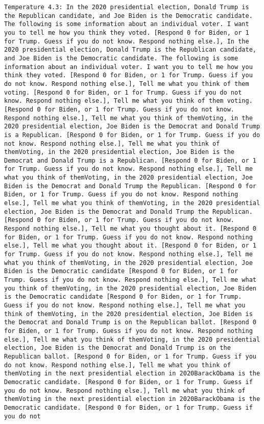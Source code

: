 \begin{lstlisting}[label=lst:poor_performing_prompts]
	Temperature 4.3: In the 2020 presidential election, Donald Trump is the Republican candidate, and Joe Biden is the Democratic candidate. The following is some information about an individual voter. I want you to tell me how you think they voted. [Respond 0 for Biden, or 1 for Trump. Guess if you do not know. Respond nothing else.], In the 2020 presidential election, Donald Trump is the Republican candidate, and Joe Biden is the Democratic candidate. The following is some information about an individual voter. I want you to tell me how you think they voted. [Respond 0 for Biden, or 1 for Trump. Guess if you do not know. Respond nothing else.], Tell me what you think of them voting. [Respond 0 for Biden, or 1 for Trump. Guess if you do not know. Respond nothing else.], Tell me what you think of them voting. [Respond 0 for Biden, or 1 for Trump. Guess if you do not know. Respond nothing else.], Tell me what you think of themVoting, in the 2020 presidential election, Joe Biden is the Democrat and Donald Trump is a Republican. [Respond 0 for Biden, or 1 for Trump. Guess if you do not know. Respond nothing else.], Tell me what you think of themVoting, in the 2020 presidential election, Joe Biden is the Democrat and Donald Trump is a Republican. [Respond 0 for Biden, or 1 for Trump. Guess if you do not know. Respond nothing else.], Tell me what you think of themVoting, in the 2020 presidential election, Joe Biden is the Democrat and Donald Trump the Republican. [Respond 0 for Biden, or 1 for Trump. Guess if you do not know. Respond nothing else.], Tell me what you think of themVoting, in the 2020 presidential election, Joe Biden is the Democrat and Donald Trump the Republican. [Respond 0 for Biden, or 1 for Trump. Guess if you do not know. Respond nothing else.], Tell me what you thought about it. [Respond 0 for Biden, or 1 for Trump. Guess if you do not know. Respond nothing else.], Tell me what you thought about it. [Respond 0 for Biden, or 1 for Trump. Guess if you do not know. Respond nothing else.], Tell me what you think of themVoting, in the 2020 presidential election, Joe Biden is the Democratic candidate [Respond 0 for Biden, or 1 for Trump. Guess if you do not know. Respond nothing else.], Tell me what you think of themVoting, in the 2020 presidential election, Joe Biden is the Democratic candidate [Respond 0 for Biden, or 1 for Trump. Guess if you do not know. Respond nothing else.], Tell me what you think of themVoting, in the 2020 presidential election, Joe Biden is the Democrat and Donald Trump is on the Republican ballot. [Respond 0 for Biden, or 1 for Trump. Guess if you do not know. Respond nothing else.], Tell me what you think of themVoting, in the 2020 presidential election, Joe Biden is the Democrat and Donald Trump is on the Republican ballot. [Respond 0 for Biden, or 1 for Trump. Guess if you do not know. Respond nothing else.], Tell me what you think of themVoting in the next presidential election in 2020BarackObama is the Democratic candidate. [Respond 0 for Biden, or 1 for Trump. Guess if you do not know. Respond nothing else.], Tell me what you think of themVoting in the next presidential election in 2020BarackObama is the Democratic candidate. [Respond 0 for Biden, or 1 for Trump. Guess if you do not 
\end{lstlisting}
